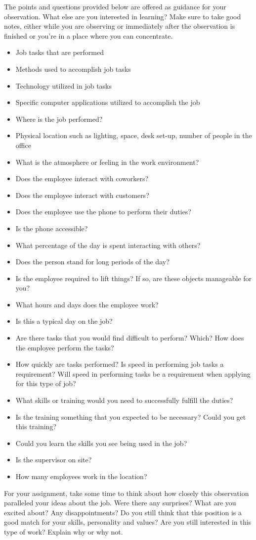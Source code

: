 The points and questions provided below are offered as guidance for your observation. What else are you interested in learning? Make sure to take good notes, either while you are observing or immediately after the observation is finished or you're in a place where you can concentrate.
\begin{itemize}[leftmargin=*]
\item Job tasks that are performed
\item Methods used to accomplish job tasks
\item Technology utilized in job tasks
\item Specific computer applications utilized to accomplish the job
\item Where is the job performed?
\item Physical location such as lighting, space, desk set-up, number of people in the office
\item What is the atmosphere or feeling in the work environment?
\item Does the employee interact with coworkers?
\item Does the employee interact with customers?
\item Does the employee use the phone to perform their duties?
\item Is the phone accessible?
\item What percentage of the day is spent interacting with others?
\item Does the person stand for long periods of the day?
 \item Is the employee required to lift things? If so, are these objects manageable for you?
\item What hours and days does the employee work?
\item Is this a typical day on the job?
\item Are there tasks that you would find difficult to perform? Which? How does the employee perform the tasks?
\item How quickly are tasks performed? Is speed in performing job tasks a requirement? Will speed in performing tasks be a requirement when applying for this type of job?
\item What skills or training would you need to successfully fulfill the duties? 
\item Is the training something that you expected to be necessary? Could you get this training?
\item Could you learn the skills you see being used in the job?
\item Is the supervisor on site?
\item How many employees work in the location?
\end{itemize}
For your assignment, take some time to think about how closely this observation paralleled your ideas about the job. Were there any surprises? What are you excited about? Any disappointments? Do you still think that this position is a good match for your skills, personality and values? Are you still interested in this type of work? Explain why or why not.

